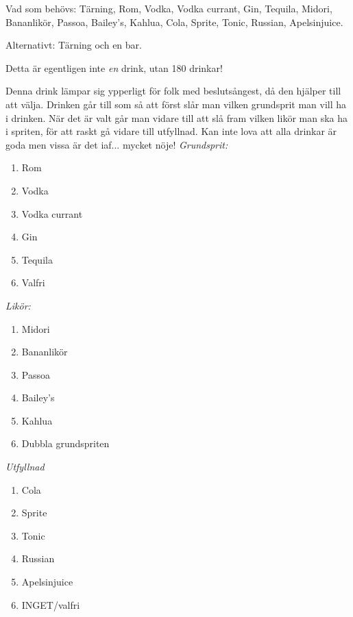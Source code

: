 

\pagestyle{Drinktips}


\filbreak
{}

Vad som behövs: Tärning, Rom, Vodka, Vodka currant, Gin, Tequila, Midori, Bananlikör, Passoa, Bailey's, Kahlua, Cola, Sprite, Tonic, Russian, Apelsinjuice.

Alternativt: Tärning och en bar.

Detta är egentligen inte \emph{en} drink, utan 180 drinkar!

Denna drink lämpar sig ypperligt för folk med beslutsångest, då den hjälper till att välja. Drinken går till som så att först slår man vilken grundsprit man vill ha i drinken. När det är valt går man vidare till att slå fram vilken likör man ska ha i spriten, för att raskt gå vidare till utfyllnad. Kan inte lova att alla drinkar är goda men vissa är det iaf... mycket nöje!
\filbreak
\emph{Grundsprit:}
\begin{enumerate}
    \item Rom
    \item Vodka
    \item Vodka currant
    \item Gin
    \item Tequila
    \item Valfri
\end{enumerate}
\filbreak
\emph{Likör:}
\begin{enumerate}
    \item Midori
    \item Bananlikör
    \item Passoa
    \item Bailey's
    \item Kahlua
    \item Dubbla grundspriten
\end{enumerate}
\filbreak
\emph{Utfyllnad}
\begin{enumerate}
    \item Cola
    \item Sprite
    \item Tonic
    \item Russian
    \item Apelsinjuice
    \item INGET/valfri
\end{enumerate}
\filbreak
{}

